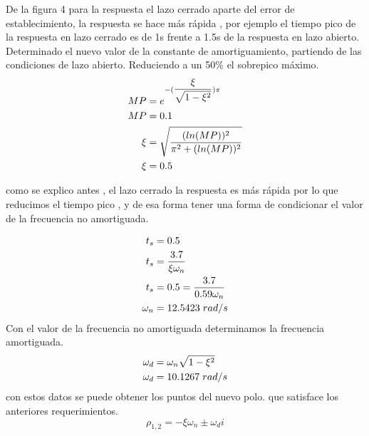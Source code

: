\documentclass[10pt, a4paper]{report}
\begin{document}

%
De la figura 4 para la respuesta el lazo cerrado aparte del error de establecimiento, la
respuesta se hace más rápida , por ejemplo el tiempo pico de la respuesta en lazo cerrado
es de 1s frente a 1.5s de la respuesta en lazo abierto.
Determinado el nuevo valor de la constante de amortiguamiento, partiendo de las
condiciones de lazo abierto.
Reduciendo a un 50$\%$ el sobrepico máximo.
\begin{equation*}
  \begin{split}
    MP &= e^{-(\dfrac{\xi}{\sqrt{1-\xi^2}})\pi }\\
    MP &= 0.1 \hspace{0.1cm} \\
    \xi &=\sqrt{\frac{(ln(MP))^2}{\pi^2 + (ln(MP))^2}}\\
    \xi &=0.5
  \end{split}
\end{equation*}

como se explico antes , el lazo cerrado la respuesta es más rápida por lo que reducimos el tiempo pico , y de esa forma tener una forma de condicionar el valor de la frecuencia no amortiguada.

\begin{equation*}
  \begin{split}
  t_{s} & = 0.5 \\
  t_{s} & = \frac{3.7}{ \xi  \omega_{n}} \\
  t_{s} & = 0.5 = \frac{3.7}{0.59  \omega_{n}}\\
  \omega_{n} & =12.5423 \hspace{0.1cm} rad/s
  \end{split}
\end{equation*}
Con el valor de la frecuencia no amortiguada determinamos la frecuencia amortiguada.
\begin{equation*}
  \begin{split}
    \omega_{d} &= \omega_{n} \sqrt{1-\xi^2}\\
    \omega_{d} &= 10.1267 \hspace{0.1cm} rad/s
  \end{split}
\end{equation*}
con estos datos se puede obtener los puntos del nuevo polo. que satisface los
anteriores requerimientos.
\begin{equation}
\rho_{1,2}=- \xi \omega_{n} \pm \omega_{d} i 
\end{equation}%
\end{document}
